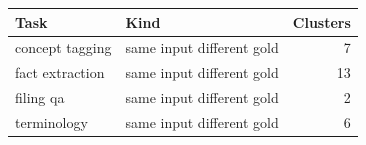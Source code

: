 \begin{tabular}{llr}
\toprule
Task & Kind & Clusters \\
\midrule
concept tagging & same input different gold & 7 \\
fact extraction & same input different gold & 13 \\
filing qa & same input different gold & 2 \\
terminology & same input different gold & 6 \\
\bottomrule
\end{tabular}
